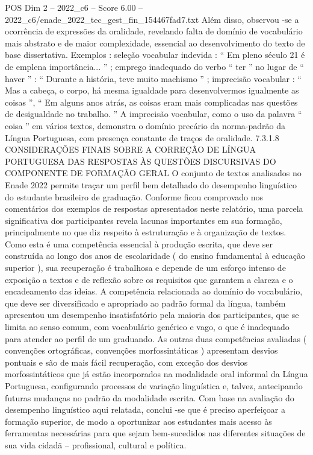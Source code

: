 \begin{textsample}{POS Dim 2 – 2022\_c6 – Score 6.00 – 2022\_c6/enade\_2022\_tec\_gest\_fin\_154467fad7.txt}
Além disso, observou -se a ocorrência de expressões da oralidade, revelando falta de domínio de vocabulário mais abstrato e de maior complexidade, essencial ao desenvolvimento do texto de base dissertativa.
Exemplos : seleção vocabular indevida : “ Em pleno século 21 é de emplena importância... ” ; emprego inadequado do verbo “ ter ” no lugar de “ haver ” : “ Durante a história, teve muito machismo ” ; imprecisão vocabular : “ Mas a cabeça, o corpo, há mesma igualdade para desenvolvermos igualmente as coisas ”, “ Em alguns anos atrás, as coisas eram mais complicadas nas questões de desigualdade no trabalho. ” A imprecisão vocabular, como o uso da palavra “ coisa ” em vários textos, demonstra o domínio precário da norma-padrão da Língua Portuguesa, com presença constante de traços de oralidade. 7.3.1.8 CONSIDERAÇÕES FINAIS SOBRE A CORREÇÃO DE LÍNGUA PORTUGUESA DAS RESPOSTAS ÀS QUESTÕES DISCURSIVAS DO COMPONENTE DE FORMAÇÃO GERAL O conjunto de textos analisados no Enade 2022 permite traçar um perfil bem detalhado do desempenho linguístico do estudante brasileiro de graduação.
Conforme ficou comprovado nos comentários dos exemplos de respostas apresentados neste relatório, uma parcela significativa dos participantes revela lacunas importantes em sua formação, principalmente no que diz respeito à estruturação e à organização de textos.
Como esta é uma competência essencial à produção escrita, que deve ser construída ao longo dos anos de escolaridade ( do ensino fundamental à educação superior ), sua recuperação é trabalhosa e depende de um esforço intenso de exposição a textos e de reflexão sobre os requisitos que garantem a clareza e o encadeamento das ideias.
A competência relacionada ao domínio do vocabulário, que deve ser diversificado e apropriado ao padrão formal da língua, também apresentou um desempenho insatisfatório pela maioria dos participantes, que se limita ao senso comum, com vocabulário genérico e vago, o que é inadequado para atender ao perfil de um graduando.
As outras duas competências avaliadas ( convenções ortográficas, convenções morfossintáticas ) apresentam desvios pontuais e são de mais fácil recuperação, com exceção dos desvios morfossintáticos que já estão incorporados na modalidade oral informal da Língua Portuguesa, configurando processos de variação linguística e, talvez, antecipando futuras mudanças no padrão da modalidade escrita.
Com base na avaliação do desempenho linguístico aqui relatada, conclui -se que é preciso aperfeiçoar a formação superior, de modo a oportunizar aos estudantes mais acesso às ferramentas necessárias para que sejam bem-sucedidos nas diferentes situações de sua vida cidadã – profissional, cultural e política.

\end{textsample}
